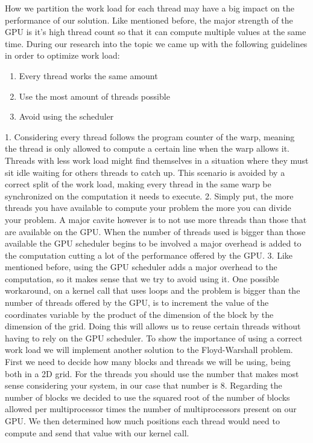\documentclass[runningheads]{llncs}
\begin{document}
How we partition the work load for each thread may have a big impact on the performance of our solution. Like mentioned before, the major strength of the GPU is it's high thread count so that it can compute multiple values at the same time.
During our research into the topic we came up with the following guidelines in order to optimize work load: %
\begin{enumerate}
	\item Every thread works the same amount
	\item Use the most amount of threads possible
	\item Avoid using the scheduler
	\newline
\end{enumerate}
1. Considering every thread follows the program counter of the warp, meaning the thread is only allowed to compute a certain line when the warp allows it.
Threads with less work load might find themselves in a situation where they must sit idle waiting for others threads to catch up.
This scenario is avoided by a correct split of the work load, making every thread in the same warp be synchronized on the computation it needs to execute.
\newline
\newline
2. Simply put, the more threads you have available to compute your problem the more you can divide your problem. A major cavite however is to not use more threads than those that are available on the GPU. When the number of threads used is bigger than those available the GPU scheduler begins to be involved a major overhead is added to the computation cutting a lot of the performance offered by the GPU.
\newline
\newline
3. Like mentioned before, using the GPU scheduler adds a major overhead to the computation, so it makes sense that we try to avoid using it.
One possible workaround, on a kernel call that uses loops and the problem is bigger than the number of threads offered by the GPU, is to increment the value of the coordinates variable by the product of the dimension of the block by the dimension of the grid. Doing this will allows us to reuse certain threads without having to rely on the GPU scheduler.
\newline
\newline
To show the importance of using a correct work load we will implement another solution to the Floyd-Warshall problem. First we need to decide how many blocks and threads we will be using, being both in a 2D grid. For the threads you should use the number that makes most sense considering your system, in our case that number is 8. Regarding the number of blocks we decided to use the squared root of the number of blocks allowed per multiprocessor times the number of multiprocessors present on our GPU. We then determined how much positions each thread would need to compute and send that value with our kernel call.
\end{document}
